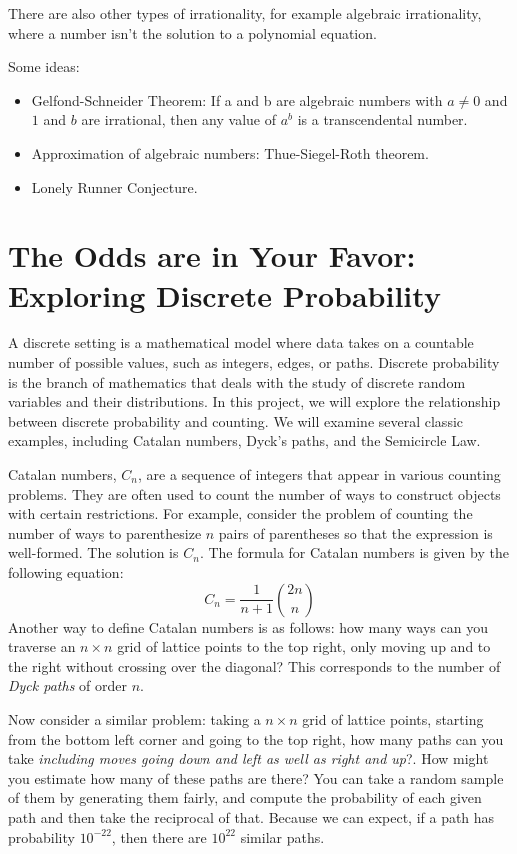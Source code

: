 \documentclass{article}
\begin{document}
        There are also other types of irrationality, for example algebraic irrationality, where a number isn't the solution to a polynomial equation.

        Some ideas:

        \begin{itemize}
            \item Gelfond-Schneider Theorem: If a and b are algebraic numbers with $a \neq 0$ and $1$ and $b$ are irrational, then any value of $a^b$ is a transcendental number.
            \item Approximation of algebraic numbers: Thue-Siegel-Roth theorem.
            \item Lonely Runner Conjecture.
        \end{itemize}

\pagebreak

\section{The Odds are in Your Favor: Exploring Discrete Probability}
    A discrete setting is a mathematical model where data takes on a countable number of possible values, such as integers, edges, or paths. Discrete probability is the branch of mathematics that deals with the study of discrete random variables and their distributions. In this project, we will explore the relationship between discrete probability and counting. We will examine several classic examples, including Catalan numbers, Dyck's paths, and the Semicircle Law.
    
    \vspace{3mm}
    Catalan numbers, $C_{n}$, are a sequence of integers that appear in various counting problems. They are often used to count the number of ways to construct objects with certain restrictions. For example, consider the problem of counting the number of ways to parenthesize $n$ pairs of parentheses so that the expression is well-formed. The solution is $C_{n}$. The formula for Catalan numbers is given by the following equation:
    $$C_{n} = \frac{1}{n+1}\binom{2n}{n}$$ Another way to define Catalan numbers is as follows: how many ways can you traverse an $n \times n$ grid of lattice points to the top right, only moving up and to the right without crossing over the diagonal? This corresponds to the number of \textit{Dyck paths} of order $n$.

    \vspace{2mm}
    Now consider a similar problem: taking a $n \times n$ grid of lattice points, starting from the bottom left corner and going to the top right, how many paths can you take \textit{including moves going down and left as well as right and up}?. How might you estimate how many of these paths are there? You can take a random sample of them by generating them fairly, and compute the probability of each given path and then take the reciprocal of that. Because we can expect, if a path has probability $10^{-22}$, then there are $10^{22}$ similar paths.
    
\end{document}
